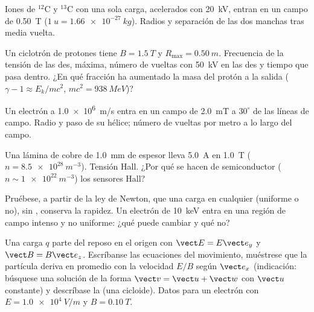 \begin{exercise}[$\star\star$]\label{exo:b1:charged-particles:6}
Iones de $^{12}$C y $^{13}$C con una sola carga, acelerados con
\qty{20}{kV}, entran en un campo de \qty{0.50}{T} ($\qty{1}{u} = \qty{1.66e-27}{kg}$).
Radios y separación de las dos manchas tras media vuelta.
\end{exercise}

\begin{exercise}[$\star\star$]\label{exo:b1:charged-particles:7}
Un ciclotrón de protones tiene $B = \qty{1.5}{T}$ y $R_{\max} = \qty{0.50}{m}$.
Frecuencia de la tensión de las des,  máxima, número de
vueltas con \qty{50}{kV} en las des y tiempo que pasa dentro. ¿En qué
fracción ha aumentado la masa del protón a la salida
($\gamma - 1 \approx E_k/mc^2$, $mc^2 = \qty{938}{MeV}$)?
\end{exercise}

\begin{exercise}[$\star\star$]\label{exo:b1:charged-particles:8}
Un electrón a \qty{1.0e6}{m/s} entra en un campo de \qty{2.0}{mT} a
$30^\circ$ de las líneas de campo. Radio y paso de su hélice; número de
vueltas por metro a lo largo del campo.
\end{exercise}

\begin{exercise}[$\star\star$]\label{exo:b1:charged-particles:9}
Una lámina de cobre de \qty{1.0}{mm} de espesor lleva \qty{5.0}{A} en
\qty{1.0}{T} ($n = \qty{8.5e28}{m^{-3}}$). Tensión Hall. ¿Por qué se hacen
de semiconductor ($n \sim \qty{1e22}{m^{-3}}$) los sensores Hall?
\end{exercise}

\begin{exercise}[$\star\star\star$]\label{exo:b1:charged-particles:10}
Pruébese, a partir de la ley de Newton, que una carga en cualquier  (uniforme o no), sin , conserva la rapidez. Un
electrón de \qty{10}{keV} entra en una región de campo intenso y no
uniforme: ¿qué puede cambiar y qué no?
\end{exercise}

\begin{exercise}[$\star\star\star$]\label{exo:b1:charged-particles:11}
Una carga $q$ parte del reposo en el origen con $\vect E = E\vect e_y$ y
$\vect B = B\vect e_z$. Escríbanse las ecuaciones del movimiento,
muéstrese que la partícula deriva en promedio con la velocidad $E/B$ según
$\vect e_x$ (indicación: búsquese una solución de la forma
$\vect v = \vect u + \vect w$ con $\vect u$ constante) y descríbase la
 (una cicloide). Datos para un electrón con
$E = \qty{1.0e4}{V/m}$ y $B = \qty{0.10}{T}$.
\end{exercise}

